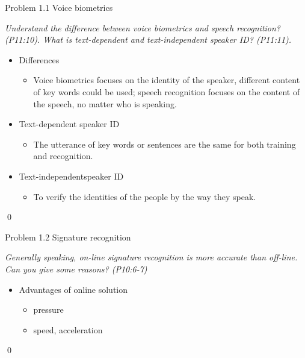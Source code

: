 \documentclass[
        ]{beamer}
\begin{document}
    		\begin{frame}[t]{Problem 1.1 Voice biometrics}    		
    			\begin{overprint}
    				\emph{Understand the difference between voice biometrics and speech recognition? (P11:10). What is text-dependent and text-independent speaker ID? (P11:11).}
    			\onslide<2> 
    			\onslide<3> 
    			\onslide<4>
    				\begin{itemize}
    				\item Differences
    					\begin{itemize}
    					\item Voice biometrics focuses on the identity of the speaker, different content of key words could be used; speech recognition focuses on the content of the speech, no matter who is speaking.
    					\end{itemize}		
    				\item Text-dependent speaker ID
    					\begin{itemize}
    					\item The utterance of key words or sentences are the same for both training and recognition.
    					\end{itemize}				
    				\item Text-independentspeaker ID
    					\begin{itemize}
    					\item To verify the identities of the people by the way they speak. 
    					\end{itemize}		
    				\end{itemize}\qed		
    			\end{overprint}
    		\end{frame}
    
    		\begin{frame}[t]{Problem 1.2 Signature recognition}    		
    			\begin{overprint}
    			\onslide<1>
    			\emph{Generally speaking, on-line signature recognition is more accurate than off-line. Can you give some reasons? (P10:6-7)}
    			\onslide<2> \inpdfc{10}{6}
    			\onslide<3> \inpdfc{10}{7}
    			\onslide<4>
    				\begin{itemize}
    				\item Advantages of online solution
    					\begin{itemize}
    					\item pressure
    					\item speed, acceleration
    					\end{itemize}		
    				\end{itemize}\qed		
    			\end{overprint}
    		\end{frame}
    
\end{document}
